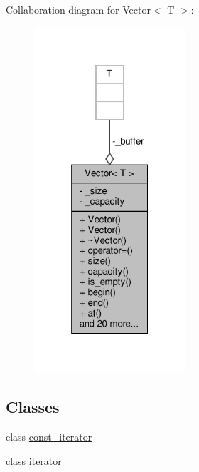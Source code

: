 Collaboration diagram for Vector$<$ T $>$\+:\nopagebreak
\begin{figure}[H]
\begin{center}
\leavevmode
\includegraphics[width=160pt]{classVector__coll__graph}
\end{center}
\end{figure}
\subsection*{Classes}
\begin{DoxyCompactItemize}
\item 
class \hyperlink{classVector_1_1const__iterator}{const\+\_\+iterator}
\item 
class \hyperlink{classVector_1_1iterator}{iterator}
\end{DoxyCompactItemize}
